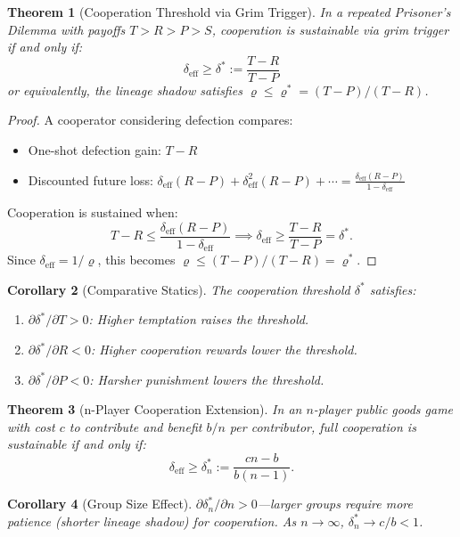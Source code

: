 \documentclass[12pt]{article}
\newtheorem{theorem}{Theorem}[section]
\newtheorem{corollary}[theorem]{Corollary}
\begin{document}
\begin{theorem}[Cooperation Threshold via Grim Trigger]
\label{thm:grim-trigger}
In a repeated Prisoner's Dilemma with payoffs $T > R > P > S$, cooperation is sustainable via grim trigger if and only if:
\[
\delta_{\mathrm{eff}} \geq \delta^* := \frac{T - R}{T - P}
\]
or equivalently, the lineage shadow satisfies $\varrho \leq \varrho^* = (T - P)/(T - R)$.
\end{theorem}

\begin{proof}
A cooperator considering defection compares:
\begin{itemize}
    \item One-shot defection gain: $T - R$
    \item Discounted future loss: $\delta_{\mathrm{eff}}(R - P) + \delta_{\mathrm{eff}}^2(R - P) + \cdots = \frac{\delta_{\mathrm{eff}}(R - P)}{1 - \delta_{\mathrm{eff}}}$
\end{itemize}
Cooperation is sustained when:
\[
T - R \leq \frac{\delta_{\mathrm{eff}}(R - P)}{1 - \delta_{\mathrm{eff}}} \implies \delta_{\mathrm{eff}} \geq \frac{T - R}{T - P} = \delta^*.
\]
Since $\delta_{\mathrm{eff}} = 1/\varrho$, this becomes $\varrho \leq (T - P)/(T - R) = \varrho^*$.
\end{proof}

\begin{corollary}[Comparative Statics]
\label{cor:comparative-statics}
The cooperation threshold $\delta^*$ satisfies:
\begin{enumerate}
    \item $\partial \delta^* / \partial T > 0$: Higher temptation raises the threshold.
    \item $\partial \delta^* / \partial R < 0$: Higher cooperation rewards lower the threshold.
    \item $\partial \delta^* / \partial P < 0$: Harsher punishment lowers the threshold.
\end{enumerate}
\end{corollary}

\begin{theorem}[n-Player Cooperation Extension]
\label{thm:n-player}
In an $n$-player public goods game with cost $c$ to contribute and benefit $b/n$ per contributor, full cooperation is sustainable if and only if:
\[
\delta_{\mathrm{eff}} \geq \delta_n^* := \frac{cn - b}{b(n - 1)}.
\]
\end{theorem}

\begin{corollary}[Group Size Effect]
$\partial \delta_n^* / \partial n > 0$---larger groups require more patience (shorter lineage shadow) for cooperation. As $n \to \infty$, $\delta_n^* \to c/b < 1$.
\end{corollary}
\end{document}
